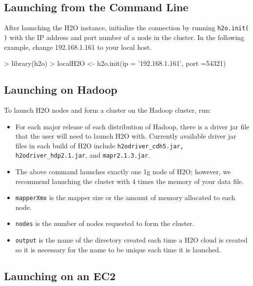 \documentclass[11pt]{article}
\begin{document}
\subsection{Launching from the Command Line}

After launching the H2O instance, initialize the connection by running {\texttt{h2o.init( )}} with the IP address and port number of a node in the cluster. In the following example, change 192.168.1.161 to your local host. 
\begin{spverbatim}
> library(h2o)
> localH2O <- h2o.init(ip = '192.168.1.161', port =54321)
\end{spverbatim}

\subsection{Launching on Hadoop}

To launch H2O nodes and form a cluster on the Hadoop cluster, run:
\begin{itemize}
\item For each major release of each distribution of Hadoop, there is a driver jar file that the user will need to launch H2O with. Currently available driver jar files in each build of H2O include {\texttt{h2odriver_cdh5.jar, h2odriver_hdp2.1.jar}}, and {\texttt{mapr2.1.3.jar}}.
\item The above command launches exactly one 1g node of H2O; however,  we recommend launching the cluster with 4 times the memory of your data file.
\item{\texttt{mapperXmx}} is the mapper size or the amount of memory allocated to each node.
\item{\texttt{nodes}} is the number of nodes requested to form the cluster.
\item{\texttt{output}} is the name of the directory created each time a H2O cloud is created so it is necessary for the name to be unique each time it is launched.
\end{itemize}


\subsection{Launching on an EC2}
\end{document}
